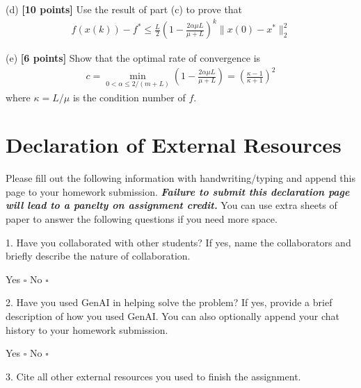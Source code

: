 \documentclass{article}
\begin{document}
\noindent
(d) \textbf{[10 points]} Use the result of part (c) to prove that
\begin{align}
	f(x(k)) - f^* \le \frac{L}{2} \left( 1 - \frac{2\alpha \mu L}{\mu+L} \right)^k \|x(0) - x^*\|^2_2
\end{align}
\begin{tcolorbox}
	\end{tcolorbox}
	
\noindent
(e) \textbf{[6 points]} Show that the optimal rate of convergence is
\begin{align}
	c = \min_{0 < \alpha \le 2/(m+L)} \left( 1 - \frac{2\alpha \mu L}{\mu+L} \right) = \left(\frac{\kappa -1}{\kappa+1}\right)^2
\end{align}
where $\kappa =L/\mu$ is the condition number of $f$. 
\begin{tcolorbox}
	\end{tcolorbox}



\newpage
\section*{Declaration of External Resources}

Please fill out the following information with handwriting/typing and append this page to your homework submission.
\textbf{\emph{Failure to submit this declaration page will lead to a panelty on assignment credit.}}
You can use extra sheets of paper to answer the following questions if you need more space.

1. Have you collaborated with other students? If yes, name the collaborators and briefly describe the nature of collaboration.

Yes $\square$ \quad No $\square$

\begin{tcolorbox}
	\vspace{1in}
\end{tcolorbox}

2. Have you used GenAI in helping solve the problem? If yes, provide a brief description of how you used GenAI. You can also optionally append your chat history to your homework submission.

Yes $\square$ \quad No $\square$

\begin{tcolorbox}
	\vspace{1in}
\end{tcolorbox}

3. Cite all other external resources you used to finish the assignment.

\begin{tcolorbox}
	\vspace{1.6in}
\end{tcolorbox}
\end{document}
